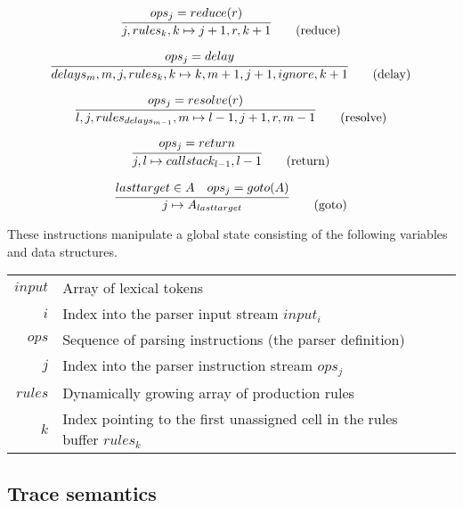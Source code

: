 \documentclass[A4]{sig-alternate}
\begin{document}
\begin{equation}
\infer{j, rules_k, k \mapsto j+1, r, k+1}{ops_j = reduce(r)} \tag{reduce}
\end{equation}

\begin{equation}
\infer{delays_m, m, j, rules_k, k \mapsto k, m+1, j+1, ignore, k+1}{ops_j = delay} \tag{delay}
\end{equation}

\begin{equation}
\infer{l, j, rules_{delays_{m-1}}, m \mapsto l-1, j+1, r, m-1}{ops_j = resolve(r)} \tag{resolve}
\end{equation}

\begin{equation}
\infer{j, l \mapsto callstack_{l-1}, l-1}{ops_j = return} \tag{return}
\end{equation}

\begin{equation}
\infer{j \mapsto A_{lasttarget}}{lasttarget \in A & ops_j = goto(A)} \tag{goto}
\end{equation}

These instructions manipulate a global state consisting of the following variables and data structures.
\begin{center}
{\small
\renewcommand{\tabcolsep}{5pt}
\renewcommand{\arraystretch}{1.2}
\begin{tabular}{r p{7cm} l}
$input$ & Array of lexical tokens\\
$i$     & Index into the parser input stream $input_i$\\
$ops$   & Sequence of parsing instructions (the parser definition)\\
$j$     & Index into the parser instruction stream $ops_j$\\
$rules$ & Dynamically growing array of production rules\\
$k$     & Index pointing to the first unassigned cell in the rules buffer $rules_k$
\end{tabular}}
\end{center}

\subsection{Trace semantics}
\end{document}
